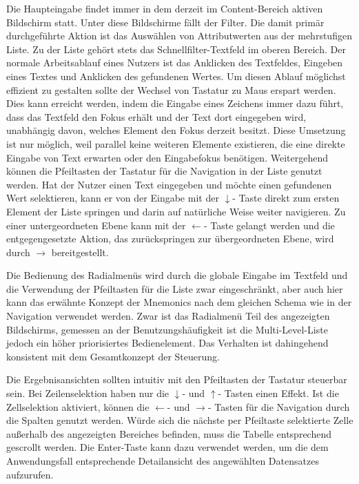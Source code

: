 Die Haupteingabe findet immer in dem derzeit im Content-Bereich aktiven Bildschirm statt. Unter diese Bildschirme fällt der Filter. Die damit primär durchgeführte Aktion ist das Auswählen von Attributwerten aus der mehrstufigen Liste. Zu der Liste gehört stets das Schnellfilter-Textfeld im oberen Bereich. Der normale Arbeitsablauf eines Nutzers ist das Anklicken des Textfeldes, Eingeben eines Textes und Anklicken des gefundenen Wertes. Um diesen Ablauf möglichst effizient zu gestalten sollte der Wechsel von Tastatur zu Maus erspart werden. Dies kann erreicht werden, indem die Eingabe eines Zeichens immer dazu führt, dass das Textfeld den Fokus erhält und der Text dort eingegeben wird, unabhängig davon, welches Element den Fokus derzeit besitzt. Diese Umsetzung ist nur möglich, weil parallel keine weiteren Elemente existieren, die eine direkte Eingabe von Text erwarten oder den Eingabefokus benötigen. Weitergehend können die Pfeiltasten der Tastatur für die Navigation in der Liste genutzt werden. Hat der Nutzer einen Text eingegeben und möchte einen gefundenen Wert selektieren, kann er von der Eingabe mit der $\downarrow$- Taste direkt zum ersten Element der Liste springen und darin auf natürliche Weise weiter navigieren. Zu einer untergeordneten Ebene kann mit der $\leftarrow$- Taste gelangt werden und die entgegengesetzte Aktion, das zurückspringen zur übergeordneten Ebene, wird durch $\rightarrow$ bereitgestellt.\par
Die Bedienung des Radialmenüs wird durch die globale Eingabe im Textfeld und die Verwendung der Pfeiltasten für die Liste zwar eingeschränkt, aber auch hier kann das erwähnte Konzept der Mnemonics nach dem gleichen Schema wie in der Navigation verwendet werden. Zwar ist das Radialmenü Teil des angezeigten Bildschirms, gemessen an der Benutzungshäufigkeit ist die Multi-Level-Liste jedoch ein höher priorisiertes Bedienelement. Das Verhalten ist dahingehend konsistent mit dem Gesamtkonzept der Steuerung.\par
{}
Die Ergebnisansichten sollten intuitiv mit den Pfeiltasten der Tastatur steuerbar sein. Bei Zeilenselektion haben nur die $\downarrow$- und $\uparrow$- Tasten einen Effekt. Ist die Zellselektion aktiviert, können die $\leftarrow$- und $\rightarrow$- Tasten für die Navigation durch die Spalten genutzt werden. Würde sich die nächste per Pfeiltaste selektierte Zelle außerhalb des angezeigten Bereiches befinden, muss die Tabelle entsprechend gescrollt werden. Die Enter-Taste kann dazu verwendet werden, um die dem Anwendungsfall entsprechende Detailansicht des angewählten Datensatzes aufzurufen.\par
